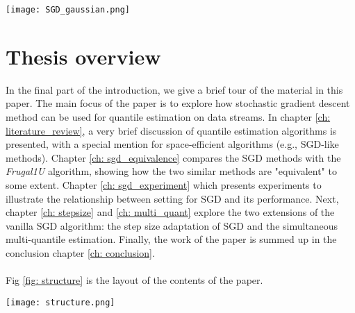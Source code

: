 \begin{figure*}[h!]
	\texttt{[image: SGD\_gaussian.png]}
    \caption{SGD quantile estimation of the $0.99$-q for a dataset of 2000 samples from a Gaussian distribution. The left graph is a combination of incoming data points and the SGD steps, and each step of SGD is triggered by a new coming data point. The blue line shows how the SGD result is updated on the arrival of a data point (sea-green), and straight line (violet) represents the empirical value of $0.99$-q. On the right side, the density of the bell-shaped dataset is shown in a histogram.}
    \label{fig: SGD_quant}
\end{figure*}

\section{Thesis overview}
\label{sec: intro_overview}
In the final part of the introduction, we give a brief tour of the material in this paper.
The main focus of the paper is to explore how stochastic gradient descent method can be used for quantile estimation on data streams.
In chapter \ref{ch: literature_review}, a very brief discussion of quantile estimation algorithms is presented, with a special mention for space-efficient algorithms (e.g., SGD-like methods). 
Chapter \ref{ch: sgd_equivalence} compares the SGD methods with the \textit{Frugal1U} algorithm\cite{maFrugalStreamingEstimating2014}, showing how the two similar methods are "equivalent" to some extent.
Chapter \ref{ch: sgd_experiment} which presents experiments to illustrate the relationship between setting for SGD and its performance.
Next, chapter \ref{ch: stepsize} and \ref{ch: multi_quant} explore the two extensions of the vanilla SGD algorithm: the step size adaptation of SGD and the simultaneous multi-quantile estimation. Finally, the work of the paper is summed up in the conclusion chapter \ref{ch: conclusion}.
\\\\
Fig \ref{fig: structure} is the layout of the contents of the paper.

\begin{figure*}[h!]
    \centering
	\texttt{[image: structure.png]}
    \caption{The relationship between topics covered in the thesis. Topics are roughly positioned along the top-bottom axis depending on where they are more close to SGD methods (left) or non-SGD methods (right). The arrows between the chapters represent are connected according to dependence.}
    \label{fig: structure}
\end{figure*}